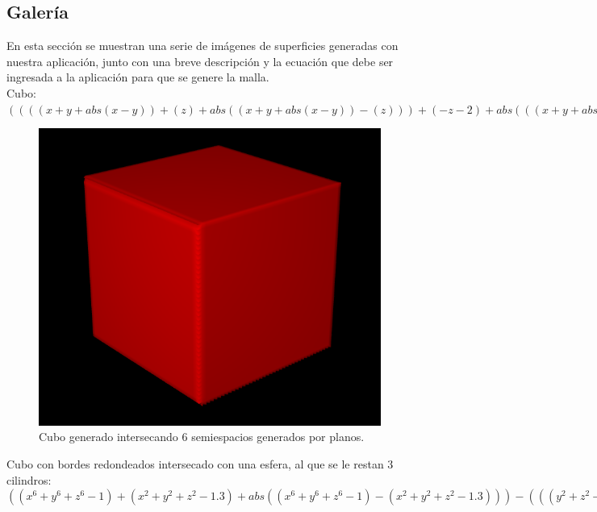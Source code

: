 \documentclass[12pt]{article}
\begin{document}
\subsection{Galería}
En esta sección se muestran una serie de imágenes de superficies generadas con nuestra aplicación, junto con una breve descripción y la ecuación que debe ser ingresada a la aplicación para que se genere la malla.
\\Cubo: $((((x+y+abs(x-y))+(z)+ abs((x+y+abs(x-y))-(z)))+ (-z-2)+abs(((x+y+abs (x-y))+(z)+ abs((x+y+abs(x-y))-(z))) -(-z-2)))+(-x-2)+ abs((((x+y+ abs(x-y))+(z)+ abs((x+y+abs (x-y)) -(z)))+(-z-2) +abs(((x+y+abs(x-y))+(z)+ abs((x+y+ abs(x-y)) -(z)))- (-z-2)))- (-x-2))) + (-y-2) +abs((((( x+y + abs(x-y))+(z)+ abs((x+ y+abs(x-y))-(z)))+(-z-2)+ abs(((x+ y+ abs(x-y))+ (z)+abs((x+y+abs (x-y))-(z)))-(-z-2)))+ (-x-2) +abs((((x+y+abs(x-y))+(z)+ abs((x+y+ abs(x-y))-(z)))+(-z-2)+abs(((x+y+abs(x-y))+(z)+ abs((x+y+abs (x-y))-(z)))-(-z-2)))-(-x-2)))-(-y-2))$
\begin{figure}[h!]
\includegraphics[width=0.7\linewidth,center]{g1.png}
\caption{Cubo generado intersecando 6 semiespacios generados por planos.}
\end{figure}
\clearpage
Cubo con bordes redondeados intersecado con una esfera, al que se le restan 3 cilindros: $((x^6+y^6+z^6-1) +(x^2+y^2+z^2-1.3) +abs((x^6+y^6+z^6-1) -(x^2+y^2+z^2-1.3 ))) -(((y^2+z^2-.5) +(x^2+z^2-.5) -abs((y^2+z^2-.5)-(x^2+z^2-.5))) +(x^2+y^2-.5) -abs(((y^2+z^2-.5)+ (x^2+z^2-.5) - abs ((y^2+z^2-.5) - (x^2+z^2-.5))) -(x^2+y^2-.5))) + abs(((x^6+y^6+z^6-1) +(x^2+y^2+z^2-1.3) + abs((x^6+y^6+z^6-1) -(x^2+y^2+z^2-1.3))) +(((y^2+z^2-.5) +(x^2+z^2-.5)-abs((y^2+z^2-.5)-(x^2+z^2-.5)))+(x^2+y^2-.5)-abs(((y^2+z^2-.5)+(x^2+z^2-.5)-abs((y^2+z^2-.5)-(x^2+z^2-.5)))-(x^2+y^2-.5))))$\\ 
\end{document}
